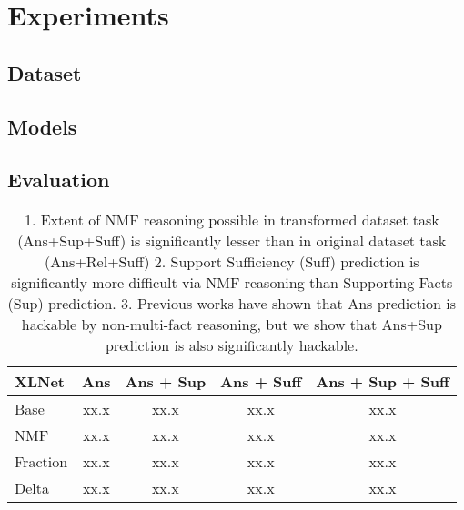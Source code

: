 \section{Experiments}

\subsection{Dataset}

\subsection{Models}


\subsection{Evaluation}


\begin{table*}[t!]
    \centering
    \setlength\tabcolsep{7pt}
    \begin{tabular}{lcccc}\toprule
        XLNet & Ans & Ans + Sup & Ans + Suff & Ans + Sup + Suff \\
        \midrule \midrule
        Base                    & xx.x & xx.x & xx.x & xx.x \\
        \midrule
        NMF                     & xx.x & xx.x & xx.x & xx.x \\
        \bottomrule
        Fraction                & xx.x & xx.x & xx.x & xx.x \\
        \midrule
        Delta                   & xx.x & xx.x & xx.x & xx.x \\
        \bottomrule
    \end{tabular}
    \caption{1. Extent of NMF reasoning possible in transformed dataset task (Ans+Sup+Suff) is significantly lesser than in original dataset task (Ans+Rel+Suff) 2. Support Sufficiency (Suff) prediction is significantly more difficult via NMF reasoning than Supporting Facts (Sup) prediction. 3. Previous works have shown that Ans prediction is hackable by non-multi-fact reasoning, but we show that Ans+Sup prediction is also significantly hackable.}
    \label{table:main-results}
\end{table*}



